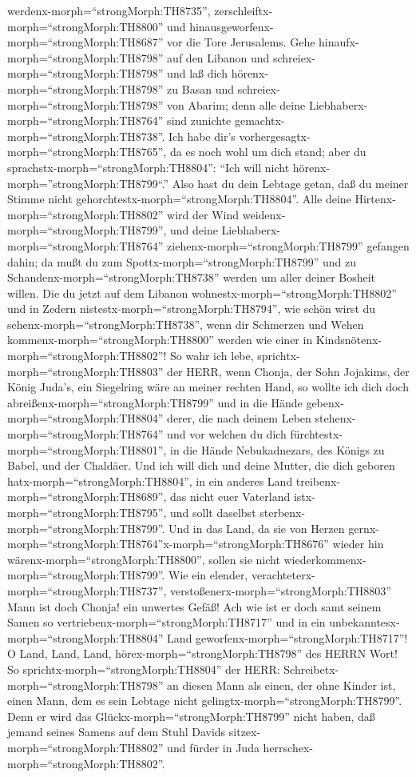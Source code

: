 werdenx-morph=``strongMorph:TH8735'',
zerschleiftx-morph=``strongMorph:TH8800'' und
hinausgeworfenx-morph=``strongMorph:TH8687'' vor die Tore Jerusalems.
 Gehe hinaufx-morph=``strongMorph:TH8798'' auf den Libanon
und schreiex-morph=``strongMorph:TH8798'' und laß dich
hörenx-morph=``strongMorph:TH8798'' zu Basan und
schreiex-morph=``strongMorph:TH8798'' von Abarim; denn alle deine
Liebhaberx-morph=``strongMorph:TH8764'' sind zunichte
gemachtx-morph=``strongMorph:TH8738''.  Ich habe dir's
vorhergesagtx-morph=``strongMorph:TH8765'', da es noch wohl um dich
stand; aber du sprachstx-morph=``strongMorph:TH8804'': ``Ich will nicht
hörenx-morph=''strongMorph:TH8799``.'' Also hast du dein Lebtage getan,
daß du meiner Stimme nicht gehorchtestx-morph=``strongMorph:TH8804''.
 Alle deine Hirtenx-morph=``strongMorph:TH8802'' wird der
Wind weidenx-morph=``strongMorph:TH8799'', und deine
Liebhaberx-morph=``strongMorph:TH8764''
ziehenx-morph=``strongMorph:TH8799'' gefangen dahin; da mußt du zum
Spottx-morph=``strongMorph:TH8799'' und zu
Schandenx-morph=``strongMorph:TH8738'' werden um aller deiner Bosheit
willen.  Die du jetzt auf dem Libanon
wohnestx-morph=``strongMorph:TH8802'' und in Zedern
nistestx-morph=``strongMorph:TH8794'', wie schön wirst du
sehenx-morph=``strongMorph:TH8738'', wenn dir Schmerzen und Wehen
kommenx-morph=``strongMorph:TH8800'' werden wie einer in
Kindsnötenx-morph=``strongMorph:TH8802''!  So wahr ich
lebe, sprichtx-morph=``strongMorph:TH8803'' der HERR, wenn Chonja, der
Sohn Jojakims, der König Juda's, ein Siegelring wäre an meiner rechten
Hand, so wollte ich dich doch abreißenx-morph=``strongMorph:TH8799''
 und in die Hände gebenx-morph=``strongMorph:TH8804''
derer, die nach deinem Leben stehenx-morph=``strongMorph:TH8764'' und
vor welchen du dich fürchtestx-morph=``strongMorph:TH8801'', in die
Hände Nebukadnezars, des Königs zu Babel, und der Chaldäer.
 Und ich will dich und deine Mutter, die dich geboren
hatx-morph=``strongMorph:TH8804'', in ein anderes Land
treibenx-morph=``strongMorph:TH8689'', das nicht euer Vaterland
istx-morph=``strongMorph:TH8795'', und sollt daselbst
sterbenx-morph=``strongMorph:TH8799''.  Und in das Land, da
sie von Herzen
gernx-morph=``strongMorph:TH8764''\textbar x-morph=``strongMorph:TH8676''
wieder hin wärenx-morph=``strongMorph:TH8800'', sollen sie nicht
wiederkommenx-morph=``strongMorph:TH8799''.  Wie ein
elender, verachteterx-morph=``strongMorph:TH8737'',
verstoßenerx-morph=``strongMorph:TH8803'' Mann ist doch Chonja! ein
unwertes Gefäß! Ach wie ist er doch samt seinem Samen so
vertriebenx-morph=``strongMorph:TH8717'' und in ein
unbekanntesx-morph=``strongMorph:TH8804'' Land
geworfenx-morph=``strongMorph:TH8717''!  O Land, Land,
Land, hörex-morph=``strongMorph:TH8798'' des HERRN Wort! 
So sprichtx-morph=``strongMorph:TH8804'' der HERR:
Schreibetx-morph=``strongMorph:TH8798'' an diesen Mann als einen, der
ohne Kinder ist, einen Mann, dem es sein Lebtage nicht
gelingtx-morph=``strongMorph:TH8799''. Denn er wird das
Glückx-morph=``strongMorph:TH8799'' nicht haben, daß jemand seines
Samens auf dem Stuhl Davids sitzex-morph=``strongMorph:TH8802'' und
fürder in Juda herrschex-morph=``strongMorph:TH8802''.

